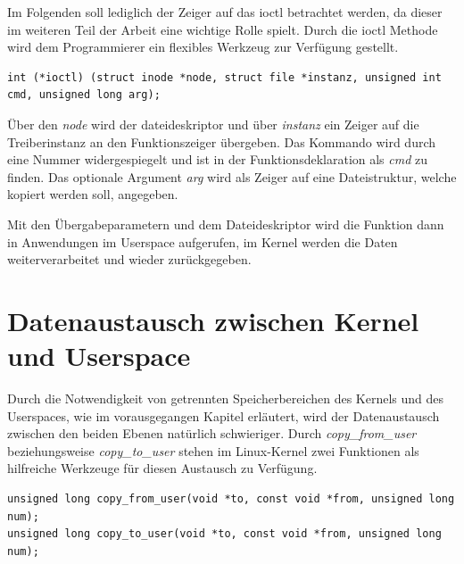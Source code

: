 Im Folgenden soll lediglich der Zeiger auf das \acf{ioctl} betrachtet werden, da dieser im weiteren Teil der Arbeit eine wichtige Rolle spielt.
Durch die \ac{ioctl} Methode wird dem Programmierer ein flexibles Werkzeug zur Verfügung gestellt. 


\begin{lstfloat}
\begin{lstlisting}
int (*ioctl) (struct inode *node, struct file *instanz, unsigned int cmd, unsigned long arg);
\end{lstlisting}
\end{lstfloat}

Über den \textit{node} wird der \gls{dateideskriptor} und über \textit{instanz} ein Zeiger auf die Treiberinstanz an den Funktionszeiger übergeben. Das Kommando wird durch eine Nummer widergespiegelt und ist in der Funktionsdeklaration als \textit{cmd} zu finden. Das optionale Argument \textit{arg} wird als Zeiger auf eine Dateistruktur, welche kopiert werden soll, angegeben. \citep[S. 249f.]{schroder2009embedded} %


Mit den Übergabeparametern und dem Dateideskriptor wird die Funktion dann in Anwendungen im Userspace aufgerufen, im Kernel werden die Daten weiterverarbeitet und wieder zurückgegeben.

\section{Datenaustausch zwischen Kernel und Userspace}
Durch die Notwendigkeit von getrennten Speicherbereichen des Kernels und des Userspaces, wie im vorausgegangen Kapitel erläutert, wird der Datenaustausch zwischen den beiden Ebenen natürlich schwieriger. Durch \textit{copy\_from\_user} beziehungsweise \textit{copy\_to\_user} stehen im Linux-Kernel zwei Funktionen als hilfreiche Werkzeuge für diesen Austausch zu Verfügung. %


\begin{lstfloat}
\begin{lstlisting}
unsigned long copy_from_user(void *to, const void *from, unsigned long num);
unsigned long copy_to_user(void *to, const void *from, unsigned long num);
\end{lstlisting}
\end{lstfloat}

